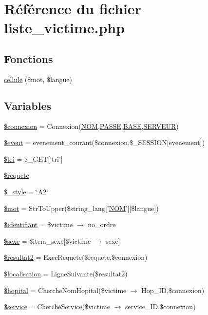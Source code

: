 \hypertarget{liste__victime_8php}{
\section{R\'{e}f\'{e}rence du fichier liste\_\-victime.php}
\label{liste__victime_8php}
}
\subsection*{Fonctions}
\begin{CompactItemize}
\item 
\hyperlink{liste__victime_8php_a12}{cellule} (\$mot, \$langue)
\end{CompactItemize}
\subsection*{Variables}
\begin{CompactItemize}
\item 
\hyperlink{liste__victime_8php_a0}{\$connexion} = Connexion(\hyperlink{pma__connect_8php_a0}{NOM},\hyperlink{pma__connect_8php_a1}{PASSE},\hyperlink{pma__connect_8php_a3}{BASE},\hyperlink{pma__connect_8php_a2}{SERVEUR})
\item 
\hyperlink{liste__victime_8php_a1}{\$event} = evenement\_\-courant(\$connexion,\$\_\-SESSION\mbox{[}evenement\mbox{]})
\item 
\hyperlink{liste__victime_8php_a2}{\$tri} = \$\_\-GET\mbox{[}'tri'\mbox{]}
\item 
\hyperlink{liste__victime_8php_a3}{\$requete}
\item 
\hyperlink{liste__victime_8php_a4}{\$\_\-style} = \char`\"{}A2\char`\"{}
\item 
\hyperlink{liste__victime_8php_a5}{\$mot} = Str\-To\-Upper(\$string\_\-lang\mbox{[}'\hyperlink{pma__connect_8php_a0}{NOM}'\mbox{]}\mbox{[}\$langue\mbox{]})
\item 
\hyperlink{liste__victime_8php_a6}{\$identifiant} = \$victime $\rightarrow$ no\_\-ordre
\item 
\hyperlink{liste__victime_8php_a7}{\$sexe} = \$item\_\-sexe\mbox{[}\$victime $\rightarrow$ sexe\mbox{]}
\item 
\hyperlink{liste__victime_8php_a8}{\$resultat2} = Exec\-Requete(\$requete,\$connexion)
\item 
\hyperlink{liste__victime_8php_a9}{\$localisation} = Ligne\-Suivante(\$resultat2)
\item 
\hyperlink{liste__victime_8php_a10}{\$hopital} = Cherche\-Nom\-Hopital(\$victime $\rightarrow$ Hop\_\-ID,\$connexion)
\item 
\hyperlink{liste__victime_8php_a11}{\$service} = Cherche\-Service(\$victime $\rightarrow$ service\_\-ID,\$connexion)
\end{CompactItemize}


